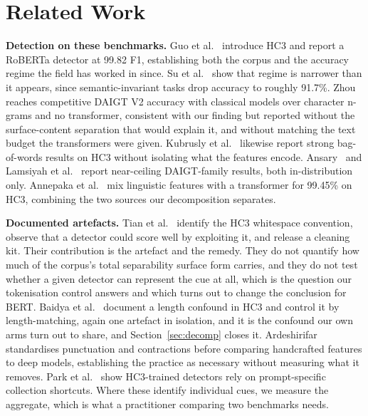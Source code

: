 \section{Related Work}

\textbf{Detection on these benchmarks.} Guo et al.~\cite{Guo2023close} introduce HC3 and report a RoBERTa detector at 99.82 F1, establishing both the corpus and the accuracy regime the field has worked in since. Su et al.~\cite{Su2023plus} show that regime is narrower than it appears, since semantic-invariant tasks drop accuracy to roughly 91.7\%. Zhou~\cite{Zhou2024exploiting} reaches competitive DAIGT V2 accuracy with classical models over character n-grams and no transformer, consistent with our finding but reported without the surface-content separation that would explain it, and without matching the text budget the transformers were given. Kubrusly et al.~\cite{Kubrusly2025detecting} likewise report strong bag-of-words results on HC3 without isolating what the features encode. Ansary~\cite{Ansary2026multirepresentation} and Lamsiyah et al.~\cite{Lamsiyah2025daigt} report near-ceiling DAIGT-family results, both in-distribution only. Annepaka et al.~\cite{Annepaka2026synergizing} mix linguistic features with a transformer for 99.45\% on HC3, combining the two sources our decomposition separates.

\textbf{Documented artefacts.} Tian et al.~\cite{Tian2023multiscale} identify the HC3 whitespace convention, observe that a detector could score well by exploiting it, and release a cleaning kit. Their contribution is the artefact and the remedy. They do not quantify how much of the corpus's total separability surface form carries, and they do not test whether a given detector can represent the cue at all, which is the question our tokenisation control answers and which turns out to change the conclusion for BERT. Baidya et al.~\cite{Baidya2026detecting} document a length confound in HC3 and control it by length-matching, again one artefact in isolation, and it is the confound our own arms turn out to share, and Section~\ref{sec:decomp} closes it. Ardeshirifar~\cite{Ardeshirifar2025comparing} standardises punctuation and contractions before comparing handcrafted features to deep models, establishing the practice as necessary without measuring what it removes. Park et al.~\cite{Park2024investigating} show HC3-trained detectors rely on prompt-specific collection shortcuts. Where these identify individual cues, we measure the aggregate, which is what a practitioner comparing two benchmarks needs.

